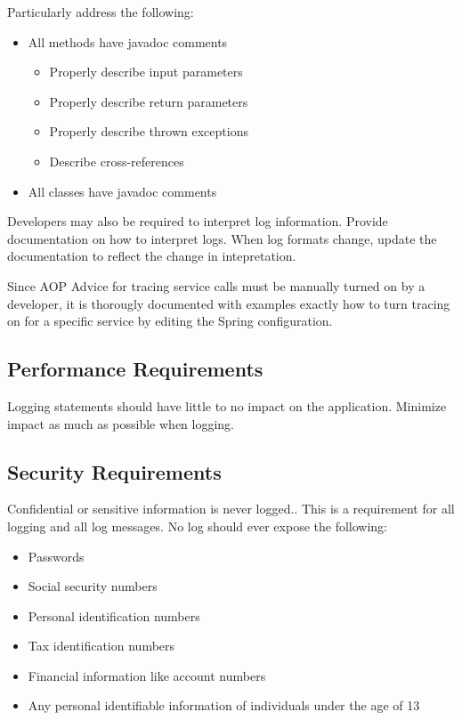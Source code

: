 \documentclass[12pt]{report}
\begin{document}
Particularly address the following:
\begin{itemize} 
\item All methods have javadoc comments
  \begin{itemize} 
  \item Properly describe input parameters
  \item Properly describe return parameters
  \item Properly describe thrown exceptions
  \item Describe cross-references
  \end{itemize}
\item All classes have javadoc comments
\end{itemize}

Developers may also be required to interpret log information. Provide documentation on how to interpret logs. When log formats
change, update the documentation to reflect the change in intepretation.

Since AOP Advice for tracing service calls must be manually turned on by a developer, it is thorougly documented with examples
exactly how to turn tracing on for a specific service by editing the Spring configuration.

\subsection{Performance Requirements}
Logging statements should have little to no impact on the application. Minimize impact as much as possible when logging.

\subsection{Security Requirements}
Confidential or sensitive information is never logged.. This is a requirement for all logging and all log messages. No log should ever
expose the following:
\begin{itemize}
  \item Passwords
  \item Social security numbers
  \item Personal identification numbers
  \item Tax identification numbers
  \item Financial information like account numbers 
  \item Any personal identifiable information of individuals under the age of 13
\end{itemize}
\end{document}
